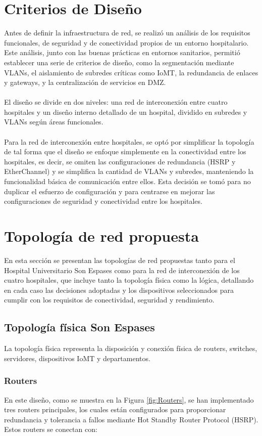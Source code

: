 \section{Criterios de Diseño}
\label{sec:criterios}
Antes de definir la infraestructura de red, se realizó un análisis de los requisitos funcionales, de seguridad y de conectividad propios de un entorno hospitalario. Este 
análisis, junto con las buenas prácticas en entornos sanitarios, permitió establecer una serie de criterios de diseño, como la segmentación mediante VLANs, el aislamiento 
de subredes críticas como IoMT, la redundancia de enlaces y gateways, y la centralización de servicios en DMZ.
\\ \\
El diseño se divide en dos niveles: una red de interconexión entre cuatro hospitales y un diseño interno detallado de un hospital, dividido en subredes y VLANs según áreas funcionales.
\\  \\
Para la red de interconexión entre hospitales, se optó por simplificar la topología de tal forma que el diseño se enfoque simplemente en la conectividad entre los hospitales, es decir,
se omiten las configuraciones de redundancia (HSRP y EtherChannel) y se simplifica la cantidad de VLANs y subredes, manteniendo la funcionalidad básica de comunicación entre ellos. Esta decisión se tomó 
para no duplicar el esfuerzo de configuración y para centrarse en mejorar las configuraciones de seguridad y conectividad entre los hospitales. 

\section{Topología de red propuesta}
En esta sección se presentan las topologías de red propuestas tanto para el Hospital Universitario Son Espases como para la red de interconexión de los cuatro hospitales, que incluye tanto la topología física como la lógica, detallando en cada caso las decisiones adoptadas
y los dispositivos seleccionados para cumplir con los requisitos de conectividad, seguridad y rendimiento.

\subsection{Topología física Son Espases}\label{subsec:topologiafisica}
La topología física representa la disposición y conexión física de routers, switches, servidores, dispositivos IoMT y departamentos.
\subsubsection{Routers}
En este diseño, como se muestra en la Figura \ref{fig:Routers}, se han implementado tres routers principales, los cuales están configurados para proporcionar 
redundancia y tolerancia a fallos mediante Hot Standby Router Protocol (HSRP). Estos routers se conectan con:

